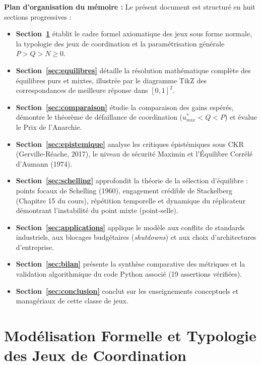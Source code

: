 \documentclass[11pt,a4paper]{article}
\begin{document}
\textbf{Plan d'organisation du mémoire :}
Le présent document est structuré en huit sections progressives :
\begin{itemize}[leftmargin=1.5em]
    \item \textbf{Section~\ref{sec:modelisation}} établit le cadre formel axiomatique des jeux sous forme normale, la typologie des jeux de coordination et la paramétrisation générale $P > Q > N \ge 0$.
    \item \textbf{Section~\ref{sec:equilibres}} détaille la résolution mathématique complète des équilibres purs et mixtes, illustrée par le diagramme TikZ des correspondances de meilleure réponse dans $[0,1]^2$.
    \item \textbf{Section~\ref{sec:comparaison}} étudie la comparaison des gains espérés, démontre le théorème de défaillance de coordination ($u_{mix}^* < Q < P$) et évalue le Prix de l'Anarchie.
    \item \textbf{Section~\ref{sec:epistemique}} analyse les critiques épistémiques sous CKR (Gerville-Réache, 2017), le niveau de sécurité Maximin et l'Équilibre Corrélé d'Aumann (1974).
    \item \textbf{Section~\ref{sec:schelling}} approfondit la théorie de la sélection d'équilibre : points focaux de Schelling (1960), engagement crédible de Stackelberg (Chapitre 15 du cours), répétition temporelle et dynamique du réplicateur démontrant l'instabilité du point mixte (point-selle).
    \item \textbf{Section~\ref{sec:applications}} applique le modèle aux conflits de standards industriels, aux blocages budgétaires (\emph{shutdowns}) et aux choix d'architectures d'entreprise.
    \item \textbf{Section~\ref{sec:bilan}} présente la synthèse comparative des métriques et la validation algorithmique du code Python associé (19 assertions vérifiées).
    \item \textbf{Section~\ref{sec:conclusion}} conclut sur les enseignements conceptuels et managériaux de cette classe de jeux.
\end{itemize}

\newpage
{}
\setcounter{page}{1}

\section{Modélisation Formelle et Typologie des Jeux de Coordination}\label{sec:modelisation}
\end{document}
